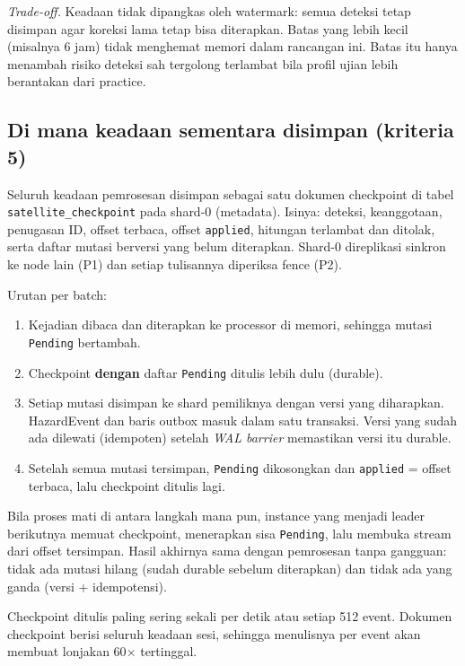 \emph{Trade-off.} Keadaan tidak dipangkas oleh watermark: semua deteksi tetap disimpan agar koreksi lama tetap bisa diterapkan. Batas yang lebih kecil (misalnya 6 jam) tidak menghemat memori dalam rancangan ini. Batas itu hanya menambah risiko deteksi sah tergolong terlambat bila profil ujian lebih berantakan dari practice.


\subsection{Di mana keadaan sementara disimpan (kriteria 5)}

Seluruh keadaan pemrosesan disimpan sebagai satu dokumen checkpoint di tabel \texttt{satellite\_\allowbreak{}checkpoint} pada shard-0 (metadata). Isinya: deteksi, keanggotaan, penugasan ID, offset terbaca, offset \texttt{applied}, hitungan terlambat dan ditolak, serta daftar mutasi berversi yang belum diterapkan. Shard-0 direplikasi sinkron ke node lain (P1) dan setiap tulisannya diperiksa fence (P2).


Urutan per batch:

\begin{enumerate}
\item Kejadian dibaca dan diterapkan ke processor di memori, sehingga mutasi \texttt{Pending} bertambah.
\item Checkpoint \textbf{dengan} daftar \texttt{Pending} ditulis lebih dulu (durable).
\item Setiap mutasi disimpan ke shard pemiliknya dengan versi yang diharapkan. HazardEvent dan baris outbox masuk dalam satu transaksi. Versi yang sudah ada dilewati (idempoten) setelah \emph{WAL barrier} memastikan versi itu durable.
\item Setelah semua mutasi tersimpan, \texttt{Pending} dikosongkan dan \texttt{applied} = offset terbaca, lalu checkpoint ditulis lagi.
\end{enumerate}

Bila proses mati di antara langkah mana pun, instance yang menjadi leader berikutnya memuat checkpoint, menerapkan sisa \texttt{Pending}, lalu membuka stream dari offset tersimpan. Hasil akhirnya sama dengan pemrosesan tanpa gangguan: tidak ada mutasi hilang (sudah durable sebelum diterapkan) dan tidak ada yang ganda (versi + idempotensi).


Checkpoint ditulis paling sering sekali per detik atau setiap 512 event. Dokumen checkpoint berisi seluruh keadaan sesi, sehingga menulisnya per event akan membuat lonjakan 60$\times$ tertinggal.



